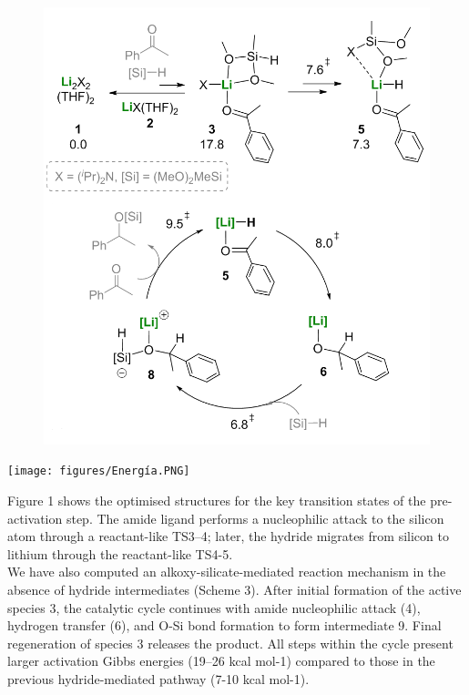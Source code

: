 \documentclass[journal=jacsat,manuscript=article]{achemso}
\begin{document}
	\begin{center}
		\begin{minipage}{0.6\textwidth} 
			\begin{figure}[H]
				\includegraphics[width=\textwidth]{figures/Ciclo.PNG}
			\end{figure}
		\end{minipage}
		
		\begin{minipage}{0.6\textwidth} 
			\begin{scheme}[H]
				\texttt{[image: figures/Energía.PNG]}
				\caption{\label{Scheme2} Computed pre-activation step and catalytic cycle, and reaction profile for the hydride-mediated Li-catalysed hydrosilylation of acetophenone. All Gibbs energies are given in THF in kcal mol-1.}
			\end{scheme}
		\end{minipage}
	\end{center}
	
	Figure 1 shows the optimised structures for the key transition states of the pre-activation step. The amide ligand performs a nucleophilic attack to the silicon atom through a reactant-like TS3–4; later, the hydride migrates from silicon to lithium	through the reactant-like TS4-5.
	\\
	We have also computed an alkoxy-silicate-mediated reaction mechanism in the absence of hydride intermediates (Scheme 3). After initial formation of the active species 3, the catalytic cycle continues with amide nucleophilic attack (4), hydrogen transfer (6), and O-Si bond formation to form intermediate 9. Final regeneration of species 3 releases the product. All steps within the cycle present larger activation Gibbs energies	(19–26 kcal mol-1) compared to those in the previous hydride-mediated pathway (7-10 kcal mol-1).
	
\end{document}
